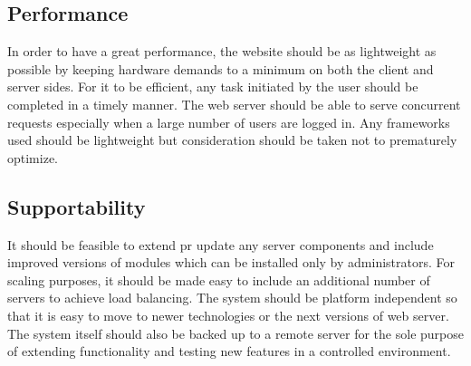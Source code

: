 \subsection{Performance}
In order to have a great performance, the website should be as lightweight as
possible by keeping hardware demands to a minimum on both the client and server
sides. For it to be efficient, any task initiated by the user should be
completed in a timely manner. The web server should be able to serve concurrent
requests especially when a large number of users are logged in. Any frameworks
used should be lightweight but consideration should be taken not to prematurely
optimize.


\subsection{Supportability}
It should be feasible to extend pr update any server components and include
improved versions of modules which can be installed only by administrators. For
scaling purposes, it should be made easy to include an additional number of
servers to achieve load balancing. The system should be platform independent so
that it is easy to move to newer technologies or the next versions of web
server. The system itself should also be backed up to a remote server for the
sole purpose of extending functionality and testing new features in a
controlled environment.

